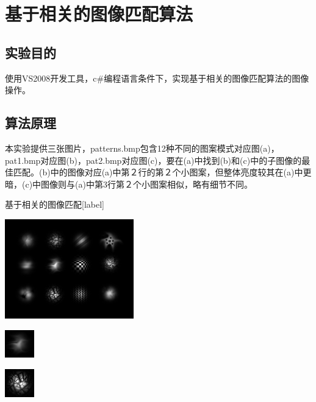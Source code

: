 ﻿\documentclass[12pt,a4paper,oneside]{book}
\begin{document}
\thispagestyle{empty}%
\setcounter{chapter}{4} 
\chapter{基于相关的图像匹配算法}
\section{实验目的}
使用VS2008开发工具，c\#编程语言条件下，实现基于相关的图像匹配算法的图像操作。
\section{算法原理}

本实验提供三张图片，patterns.bmp包含12种不同的图案模式对应图(a)，pat1.bmp对应图(b)，pat2.bmp对应图(c)，要在(a)中找到(b)和(c)中的子图像的最佳匹配。(b)中的图像对应(a)中第２行的第２个小图案，但整体亮度较其在(a)中更暗，(c)中图像则与(a)中第3行第２个小图案相似，略有细节不同。
\begin{Figure}[h]{基于相关的图像匹配}[label]
\begin{minipage}[t]{0.5\linewidth}
\centering
\includegraphics[width=2.2in]{patterns.png} 
\label*{\\a}
\end{minipage}%
\begin{minipage}[t]{0.3\linewidth}
\centering
\includegraphics[width=0.5in]{pat1.png} 
\label*{\\b}
\end{minipage}
\begin{minipage}[t]{0.15\linewidth}
\centering
\includegraphics[width=0.5in]{pat2.png} 
\label*{\\c}
\end{minipage}
\end{Figure}
\end{document}
